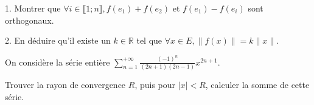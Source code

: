 \vspace{5pt}
1. Montrer que $\forall i \in \llbracket 1; n \rrbracket, f(e_1) + f(e_2)$ et $f(e_1) - f(e_i)$ sont orthogonaux.

\vspace{5pt}
2. En déduire qu'il existe un $k \in \mathbb{R}$ tel que $\forall x \in E, \| f(x) \| = k \|x\|$.



\subetoiles



\noindent On considère la série entière 
$\displaystyle \sum_{n=1}^{+\infty} \frac {(-1)^n} {(2n+1)(2n-1)} x^{2n+1}$.

\vspace{5pt}
\noindent Trouver la rayon de convergence $R$, puis pour $|x| < R$, calculer la somme de cette série.
